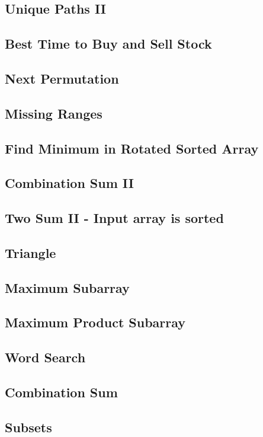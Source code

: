 \documentclass[11pt]{book}
\begin{document}
\subsection{Unique Paths II}
\label{sec-1-2-16}
\subsection{Best Time to Buy and Sell Stock}
\label{sec-1-2-17}
\subsection{Next Permutation}
\label{sec-1-2-18}
\subsection{Missing Ranges}
\label{sec-1-2-19}
\subsection{Find Minimum in Rotated Sorted Array}
\label{sec-1-2-20}
\subsection{Combination Sum II}
\label{sec-1-2-21}
\subsection{Two Sum II - Input array is sorted}
\label{sec-1-2-22}
\subsection{Triangle}
\label{sec-1-2-23}
\subsection{Maximum Subarray}
\label{sec-1-2-24}
\subsection{Maximum Product Subarray}
\label{sec-1-2-25}
\subsection{Word Search}
\label{sec-1-2-26}
\subsection{Combination Sum}
\label{sec-1-2-27}
\subsection{Subsets}
\label{sec-1-2-28}
\end{document}
